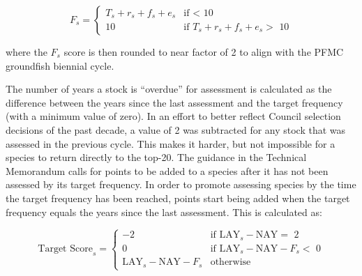 \documentclass[11pt,
  english,
  a4paper,
]{article}
\begin{document}
\leavevmode\tagmcend\tagstructend\par


{\[
F_s =
\begin{cases} 
T_s + r_s + f_s + e_s & \text{if $<$ 10}\\ 
10 & \text{if $T_s + r_s + f_s + e_s >$ 10} 
\end{cases}
\]\leavevmode\tagmcend\tagstructend}

\leavevmode\tagmcend\tagstructend\par


where the {\(F_s\)\leavevmode\tagmcend\tagstructend} score is then rounded to near factor of 2 to align with the PFMC groundfish biennial cycle.

\leavevmode\tagmcend\tagstructend\par


The number of years a stock is ``overdue'' for assessment is calculated as the difference between the years since the last assessment and the target frequency (with a minimum value of zero). In an effort to better reflect Council selection decisions of the past decade, a value of 2 was subtracted for any stock that was assessed in the previous cycle. This makes it harder, but not impossible for a species to return directly to the top-20. The guidance in the Technical Memorandum calls for points to be added to a species after it has not been assessed by its target frequency. In order to promote assessing species by the time the target frequency has been reached, points start being added when the target frequency equals the years since the last assessment. This is calculated as:

\leavevmode\tagmcend\tagstructend\par


{\[
\text{Target Score}_s = 
\begin{cases}
-2 & \text{if $\text{LAY}_{s} - \text{NAY} =$ 2}\\
0  & \text{if $\text{LAY}_{s} - \text{NAY} - F_s < $ 0}\\
\text{LAY}_{s} - \text{NAY} - F_s & \text{otherwise}
\end{cases}
\]\leavevmode\tagmcend\tagstructend}
\end{document}
